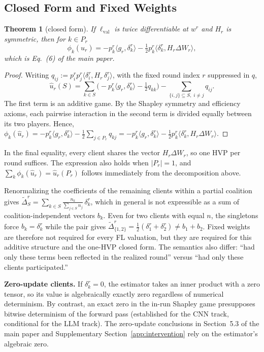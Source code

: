 \documentclass[letterpaper]{article} %
\theoremstyle{plain}
\newtheorem{theorem}{Theorem}
\newcommand{\lval}{\ell_{\mathrm{val}}}
\begin{document}
\subsection{Closed Form and Fixed Weights}
\label{app:closed}

\begin{theorem}[closed form]
\label{thm:closed}
If $\lval$ is twice differentiable at $w^r$ and $H_r$ is symmetric, then for
$k \in P_r$
\[
\phi_k(\hat u_r)
= -p_k^r \langle g_r, \delta_k^r\rangle
- \tfrac12 p_k^r \langle \delta_k^r, H_r \Delta W_r\rangle,
\]
which is Eq.~(6) of the main paper.
\end{theorem}

\begin{proof}
Writing $q_{ij} := p_i^r p_j^r\langle \delta_i^r, H_r\, \delta_j^r\rangle$,
with the fixed round index $r$ suppressed in $q$,
\[
\hat u_r(S)
= \sum_{k \in S}\Big(-p_k^r\langle g_r, \delta_k^r\rangle - \tfrac12 q_{kk}\Big)
- \sum_{\{i,j\} \subseteq S,\; i \ne j} q_{ij}.
\]
The first term is an additive game. By the Shapley symmetry and efficiency
axioms, each pairwise interaction in the second term is divided equally
between its two players. Hence,
$\phi_k(\hat u_r) = -p_k^r\langle g_r, \delta_k^r\rangle
- \tfrac12 \sum_{j \in P_r} q_{kj}
= -p_k^r\langle g_r, \delta_k^r\rangle - \tfrac12 p_k^r\langle \delta_k^r, H_r \Delta W_r\rangle$.
\end{proof}

In the final equality, every client shares the vector $H_r \Delta W_r$, so one
HVP per round suffices. The expression also holds when
$|P_r| = 1$, and $\sum_k \phi_k(\hat u_r) = \hat u_r(P_r)$ follows
immediately from the decomposition above.

Renormalizing the coefficients of the remaining clients within a partial
coalition gives
$\widetilde\Delta_S^r
= \sum_{k \in S} \frac{n_k}{\sum_{j \in S} n_j}\, \delta_k^r$,
which in general is not expressible as a sum of coalition-independent vectors
$b_k$. Even for two clients with equal $n$, the singletons force
$b_k = \delta_k^r$ while the pair gives
$\widetilde\Delta_{\{1,2\}}^r = \tfrac12(\delta_1^r + \delta_2^r) \ne b_1 + b_2$.
Fixed weights are therefore not required for every FL valuation, but they are
required for this additive structure and the one-HVP closed form. The
semantics also differ: ``had only these terms been reflected in the realized
round'' versus ``had only these clients participated.''

\textbf{Zero-update clients.} If $\delta_k^r = 0$, the estimator takes an
inner product with a zero tensor, so its value is algebraically exactly zero
regardless of numerical determinism. By contrast, an exact zero in the in-run
Shapley game presupposes bitwise determinism of the forward pass
(established for the CNN track, conditional for the LLM track). The
zero-update conclusions in Section~5.3 of the main paper and Supplementary
Section~\ref{app:intervention} rely on the estimator's algebraic zero.
\end{document}
